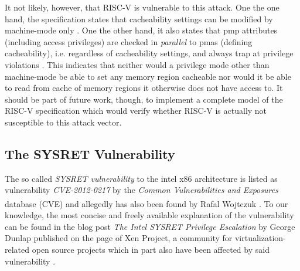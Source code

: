 It not likely, however, that RISC-V is vulnerable to this attack.
One the one hand, the specification states that cacheability settings can be modified by machine-mode only \cite[p.43]{RiscVISAP}.
One the other hand, it also states that \gls{pmp} attributes (including access privileges) are checked in \textit{parallel} to \glspl{pma} (defining cacheability), i.e. regardless of cacheability settings, and always trap at privilege violations \cite[44-45]{RiscVISAP}.
This indicates that neither would a privilege mode other than machine-mode be able to set any memory region cacheable nor would it be able to read from cache of memory regions it otherwise does not have access to.
It should be part of future work, though, to implement a complete model of the RISC-V specification which would verify whether RISC-V is actually not susceptible to this attack vector.

\subsection{The SYSRET Vulnerability}
\label{sec:sysret}

The so called \textit{SYSRET vulnerability} to the intel x86 architecture is listed as vulnerability \textit{CVE-2012-0217} by the \textit{Common Vulnerabilities and Exposures} database (CVE\textsuperscript{\textregistered}) \cite{SYSRET-vuln} and allegedly has also been found by Rafal Wojtczuk \cite{SYSRETFreeBSD,SYSRETDebian,SYSRETCert}.
To our knowledge, the most concise and freely available explanation of the vulnerability can be found in the blog post \textit{The Intel SYSRET Privilege Escalation} by George Dunlap published on the page of Xen Project, a community for virtualization-related open source projects which in part also have been affected by said vulnerability \cite{Dunlap19}.


